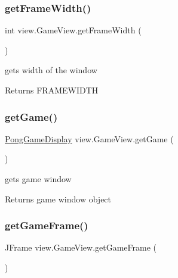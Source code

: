 \subsubsection{\texorpdfstring{get\+Frame\+Width()}{getFrameWidth()}}
{\footnotesize\ttfamily int view.\+Game\+View.\+get\+Frame\+Width (\begin{DoxyParamCaption}{ }\end{DoxyParamCaption})}



gets width of the window 

\begin{DoxyReturn}{Returns}
F\+R\+A\+M\+E\+W\+I\+D\+TH 
\end{DoxyReturn}
\hypertarget{classview_1_1_game_view_ae5dd5521b47a1bdc57e2745ff3b11815}{}\label{classview_1_1_game_view_ae5dd5521b47a1bdc57e2745ff3b11815} 
\subsubsection{\texorpdfstring{get\+Game()}{getGame()}}
{\footnotesize\ttfamily \hyperlink{classview_1_1_pong_game_display}{Pong\+Game\+Display} view.\+Game\+View.\+get\+Game (\begin{DoxyParamCaption}{ }\end{DoxyParamCaption})}



gets game window 

\begin{DoxyReturn}{Returns}
game window object 
\end{DoxyReturn}
\hypertarget{classview_1_1_game_view_a35853d75ec07ee29d9257c1785508f02}{}\label{classview_1_1_game_view_a35853d75ec07ee29d9257c1785508f02} 
\subsubsection{\texorpdfstring{get\+Game\+Frame()}{getGameFrame()}}
{\footnotesize\ttfamily J\+Frame view.\+Game\+View.\+get\+Game\+Frame (\begin{DoxyParamCaption}{ }\end{DoxyParamCaption})}



